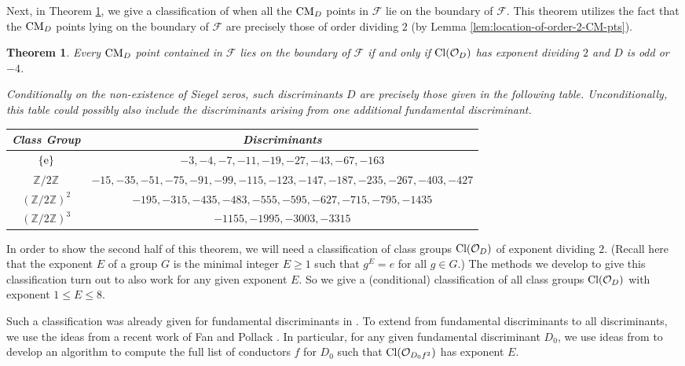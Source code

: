 \documentclass[11pt,letterpaper,reqno]{amsart}
\renewcommand{\arraystretch}{1}
\newcommand\ques[1]{\textcolor{blue}{\textbf{Question}: #1}}
\newtheorem{theorem}{Theorem}[section]
\numberwithin{equation}{section}
\numberwithin{figure}{section}
\numberwithin{table}{section}
\newcommand{\ZZ}{\mathbb{Z}}
\newcommand{\FF}{\mathcal{F}}
\newcommand{\CM}{\textnormal{CM}}
\newcommand{\Cl}[1]{\textnormal{Cl}(\mathcal{O}_{#1})}
\begin{document}
Next, in Theorem \ref{thm:all-CMpts-on-bdry}, we give a classification of when all the $\CM_D$ points in $\FF$ lie on the boundary of $\FF$. This theorem utilizes the fact that the $\CM_D$ points lying on the boundary of $\FF$ are precisely those of order dividing $2$ (by Lemma \ref{lem:location-of-order-2-CM-pts}). 

\begin{theorem} \label{thm:all-CMpts-on-bdry}
    Every $\CM_D$ point contained in $\FF$ lies on the boundary of $\FF$ if and only if $\Cl{D}$ has exponent dividing $2$ and $D$ is odd or $-4$.

    Conditionally on the non-existence of Siegel zeros, such discriminants $D$ are precisely those given in the following table. Unconditionally, this table could possibly also include the discriminants arising from one additional fundamental discriminant.

    \begin{center}
    \def\arraystretch{1.4}
    \begin{tabular}{ c | c } 
         Class Group & Discriminants \\ 
         \hline
         $\{\textnormal{e}\}$ &  $-3, -4, -7, -11, -19, -27, -43, -67, -163$\\  
         $\ZZ/2\ZZ$ &  $-15, -35, -51, -75, -91, -99, -115, -123, -147, -187, -235, -267, -403, -427$\\  
         $(\ZZ/2\ZZ)^2$ & $-195, -315, -435, -483, -555, -595, -627, -715, -795, -1435$ \\  
         $(\ZZ/2\ZZ)^3$ & $-1155, -1995, -3003, -3315$ \\
    \end{tabular}
    \end{center}
    \vspace{3mm}
\end{theorem}



In order to show the second half of this theorem, we will need a classification of class groups $\Cl{D}$ of exponent dividing $2$. (Recall here that the exponent $E$ of a group $G$ is the minimal integer $E \ge 1$ such that $g^E = e$ for all $g \in G$.)
The methods we develop to give this classification turn out to also work for any given exponent $E$. So we give a (conditional) classification of all class groups $\Cl{D}$ with exponent $1 \le E \le 8$.  

Such a classification was already given for fundamental discriminants in \cite{fieldexponents}.  
To extend from fundamental discriminants to all discriminants, we use the ideas from a recent work of Fan and Pollack \cite{FanPollack}. In particular, for any given fundamental discriminant $D_0$, we use ideas from \cite{FanPollack} to develop an algorithm to compute the full list of conductors $f$ for $D_0$ such that $\Cl{D_0 f^2}$ has exponent $E$.
\end{document}
